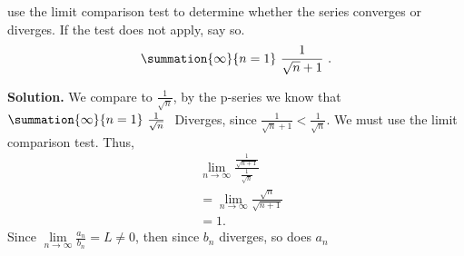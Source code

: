 \documentclass{report}
\begin{document}
   \pagebreak \bigbreak \noindent  
   \begin{eg}
      use the limit comparison test to determine whether the series converges or diverges. If the test does not apply, say so. 
      \begin{align*}
          \summation{\infty}{n=1}\ \frac{1}{\sqrt{n} + 1}\ 
      .\end{align*}
   \end{eg}
   \bigbreak \noindent 
   \textbf{Solution.} We compare to $\frac{1}{\sqrt{n}}$, by the p-series  we know that $\summation{\infty}{n=1}\ \frac{1}{\sqrt{n}}\  $ Diverges, since $\frac{1}{\sqrt{n} + 1} < \frac{1}{\sqrt{n}}$. We must use the limit comparison test. Thus, 
   \begin{align*}
       &\lim\limits_{n \to \infty}{\frac{\frac{1}{\sqrt{n+1}}}{\frac{1}{\sqrt{n}}}} \\
       &=\lim\limits_{n \to \infty}{\frac{\sqrt{n}}{\sqrt{n+1}}} \\
       &= 1
   .\end{align*}
   \bigbreak \noindent 
   Since $\lim\limits_{n \to \infty}{\frac{a_{n}}{b_{n}}} = L \ne 0$, then since $b_{n} $ diverges, so does $a_{n} $

   

    
 




    


    

        
\end{document}
